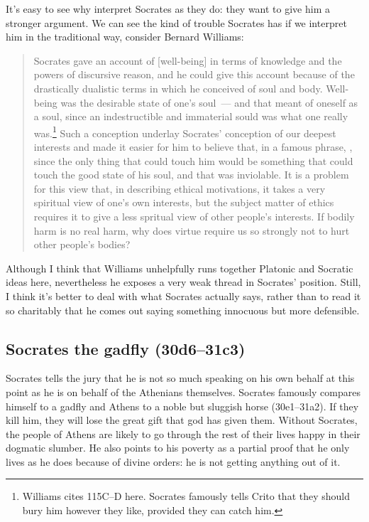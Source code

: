 \documentclass[11pt]{article}
\begin{document}
It's easy to see why \citeauthor{brickhouse2004} interpret Socrates as they do: they want to give him a stronger argument.  We can see the kind of trouble Socrates has if we interpret him in the traditional way, consider Bernard Williams:

\begin{quote}
    Socrates gave an account of [well-being] in terms of knowledge and the powers of discursive reason, and he could give this account because of the drastically dualistic terms in which he conceived of soul and body. Well-being was the desirable state of one's soul~--- and that meant of oneself as a soul, since an indestructible and immaterial sould was what one really was.\footnote{Williams cites  115C--D here.  Socrates famously tells Crito that they should bury him however they like, provided they can catch him.}  Such a conception underlay Socrates' conception of our deepest interests and made it easier for him to believe that, in a famous phrase, , since the only thing that could touch him would be something that could touch the good state of his soul, and that was inviolable.  It is a problem for this view that, in describing ethical motivations, it takes a very spiritual view of one's own interests, but the subject matter of ethics requires it to give a less spritual view of other people's interests. If bodily harm is no real harm, why does virtue require us so strongly not to hurt other people's bodies? \citep[34]{williams1985}
\end{quote}

Although I think that Williams unhelpfully runs together Platonic and Socratic ideas here, nevertheless he exposes a very weak thread in Socrates' position.  Still, I think it's better to deal with what Socrates actually says, rather than to read it so charitably that he comes out saying something innocuous but more defensible.

\subsection{Socrates the gadfly (30d6--31c3)}

Socrates tells the jury that he is not so much speaking on his own behalf at this point as he is on behalf of the Athenians themselves.  Socrates famously compares himself to a gadfly and Athens to a noble but sluggish horse (30e1--31a2).  If they kill him, they will lose the great gift that god has given them.  Without Socrates, the people of Athens are likely to go through the rest of their lives happy in their dogmatic slumber.  He also points to his poverty as a partial proof that he only lives as he does because of divine orders: he is not getting anything out of it.
\end{document}
